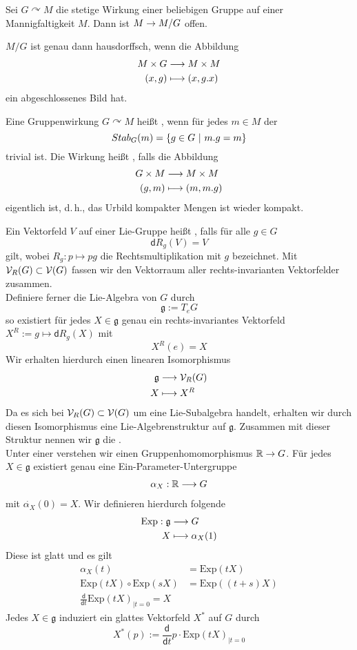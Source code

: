 \documentclass{book}
\renewcommand{\d}{\textsf{d}}
\newcommand{\g}{\mathfrak{g}}
\begin{document}
\Lem{}
Sei $G \curvearrowright M$ die stetige Wirkung einer beliebigen Gruppe auf einer Mannigfaltigkeit $M$. Dann ist $M\overset{}{\rightarrow}M/G$ offen.

\Kor{}
$M/G$ ist genau dann hausdorffsch, wenn die Abbildung
\begin{align*}
M \times G & \overset{}{\longrightarrow} M \times M\\
(x, g) & \longmapsto (x, g.x)
\end{align*}
ein abgeschlossenes Bild hat.

\Def{}
Eine Gruppenwirkung $G\curvearrowright M$ heißt , wenn für jedes $m \in M$ der 
\[ Stab_G(m) = \set{g \in G}{m.g = m} \]
trivial ist. Die Wirkung heißt , falls die Abbildung
\begin{align*}
G \times M & \overset{}{\longrightarrow} M \times M\\
(g,m) & \longmapsto (m, m.g)
\end{align*}
eigentlich ist, d.\,h., das Urbild kompakter Mengen ist wieder kompakt.

\Def{}
Ein Vektorfeld $V$ auf einer Lie-Gruppe heißt , falls für alle $g \in G$
\[ \d R_g(V) = V \]
gilt, wobei $R_g : p \mapsto pg$ die Rechtsmultiplikation mit $g$ bezeichnet. Mit $\mathcal{V}_R(G) \subset \mathcal{V}(G)$ fassen wir den Vektorraum aller rechts-invarianten Vektorfelder zusammen.\\
Definiere ferner die {Lie-Algebra} von $G$ durch
\[ \g := T_eG \]
so existiert für jedes $X \in \g$ genau ein rechts-invariantes Vektorfeld $X^R := g\mapsto \d R_g(X)$ mit
\[ X^R (e) = X \]
Wir erhalten hierdurch einen linearen Isomorphismus
\begin{align*}
\g &\Pfeil{} \V_R(G)\\
X & \longmapsto X^R
\end{align*}
Da es sich bei $\mathcal{V}_R(G) \subset \mathcal{V}(G)$ um eine Lie-Subalgebra handelt, erhalten wir durch diesen Isomorphismus eine Lie-Algebrenstruktur auf $\g$. Zusammen mit dieser Struktur nennen wir $\g$ die .\\
Unter einer  verstehen wir einen Gruppenhomomorphismus $\mathbb{R} \overset{}{\rightarrow} G$. Für jedes $X \in \g$ existiert genau eine Ein-Parameter-Untergruppe
\begin{align*}
\alpha_X : \mathbb{R} \overset{}{\longrightarrow} G
\end{align*}
mit $\dot{\alpha_X}(0) = X$. Wir definieren hierdurch folgende 
\begin{align*}
\text{Exp} : \g & \Pfeil{} G\\
X & \longmapsto \alpha_X(1)
\end{align*}
Diese ist glatt und es gilt
\begin{align*}
\alpha_X(t) &= \text{Exp}(tX)\\
\text{Exp}(tX) \circ \text{Exp}(sX) &= \text{Exp}((t+s)X)\\
\frac{\d}{\d t} \text{Exp}(tX)_{|t= 0} = X
\end{align*}
Jedes $X \in \g$ induziert ein glattes Vektorfeld $X^*$ auf $G$ durch
\[ X^*(p) := \frac{\d}{\d t} p \cdot \text{Exp}(tX)_{|t = 0} \]
\end{document}
